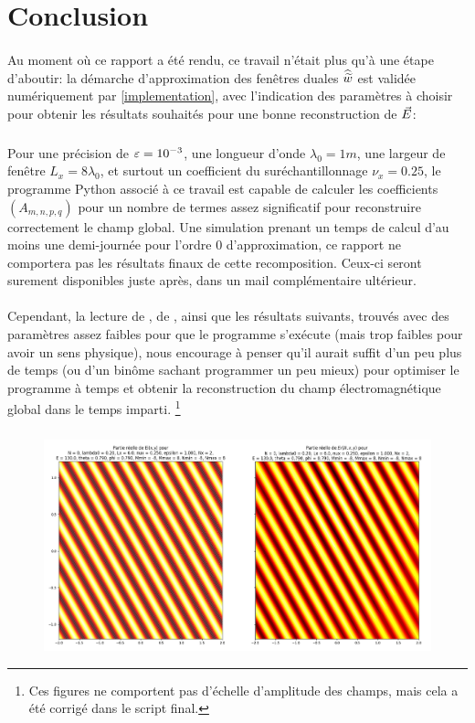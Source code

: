 \section{Conclusion}\label{conclusion}


\paragraph{}

Au moment où ce rapport a été rendu, ce travail n'était plus qu'à une étape d'aboutir:
la démarche d'approximation des fenêtres duales $\widehat{\widetilde{w}}$ est validée numériquement par \ref{implementation},
avec l'indication des paramètres à choisir pour obtenir les résultats souhaités pour une bonne reconstruction de ${\vec{E}}$:

\subparagraph{}

Pour une précision de $\varepsilon=10^{-3}$, une longueur d'onde $\lambda_0=1m$, une largeur de fenêtre $L_x=8\lambda_0$,
et surtout un coefficient du suréchantillonnage $\nu_x=0.25$, le programme Python associé à ce travail est capable
de calculer les coefficients $(A_{m,n,p,q})$ pour un nombre de termes assez significatif pour reconstruire correctement
le champ global. Une simulation prenant un temps de calcul d'au moins une demi-journée pour l'ordre $0$ d'approximation,
ce rapport ne comportera pas les résultats finaux de cette recomposition.
Ceux-ci seront surement disponibles juste après, dans un mail complémentaire ultérieur.


\paragraph{}

Cependant, la lecture de \cite{TheseLugara}, de \cite{TheseGhannoum}, ainsi que les résultats suivants,
trouvés avec des paramètres assez faibles pour que le programme s'exécute (mais trop faibles pour avoir un sens physique),
nous encourage à penser qu'il aurait suffit d'un peu plus de temps (ou d'un binôme sachant programmer un peu mieux)
pour optimiser le programme à temps et obtenir la reconstruction du champ électromagnétique global dans le temps imparti.
\footnote{Ces figures ne comportent pas d'échelle d'amplitude des champs, mais cela a été corrigé dans le script final.}

\subparagraph{}

\begin{figure}[h]
 \includegraphics[scale=0.4]{hope.png}
\end{figure}




\newpage